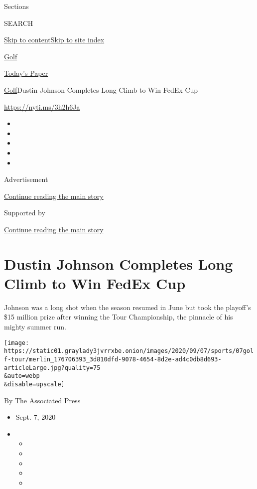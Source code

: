 Sections

SEARCH

\protect\hyperlink{site-content}{Skip to
content}\protect\hyperlink{site-index}{Skip to site index}

\href{https://www.nytimes3xbfgragh.onion/section/sports/golf}{Golf}

\href{https://myaccount.nytimes3xbfgragh.onion/auth/login?response_type=cookie\&client_id=vi}{}

\href{https://www.nytimes3xbfgragh.onion/section/todayspaper}{Today's
Paper}

\href{/section/sports/golf}{Golf}\textbar{}Dustin Johnson Completes Long
Climb to Win FedEx Cup

\url{https://nyti.ms/3h2h6Ja}

\begin{itemize}
\item
\item
\item
\item
\item
\end{itemize}

Advertisement

\protect\hyperlink{after-top}{Continue reading the main story}

Supported by

\protect\hyperlink{after-sponsor}{Continue reading the main story}

\hypertarget{dustin-johnson-completes-long-climb-to-win-fedex-cup}{%
\section{Dustin Johnson Completes Long Climb to Win FedEx
Cup}\label{dustin-johnson-completes-long-climb-to-win-fedex-cup}}

Johnson was a long shot when the season resumed in June but took the
playoff's \$15 million prize after winning the Tour Championship, the
pinnacle of his mighty summer run.

\texttt{[image: https://static01.graylady3jvrrxbe.onion/images/2020/09/07/sports/07golf-tour/merlin\_176706393\_3d810dfd-9078-4654-8d2e-ad4c0db8d693-articleLarge.jpg?quality=75\\\&auto=webp\\\&disable=upscale]}

By The Associated Press

\begin{itemize}
\item
  Sept. 7, 2020
\item
  \begin{itemize}
  \item
  \item
  \item
  \item
  \item
  \end{itemize}
\end{itemize}


